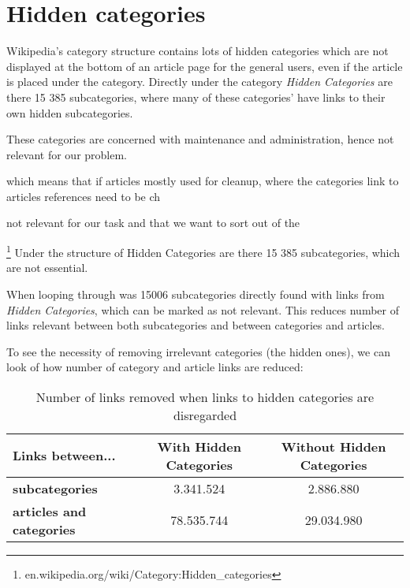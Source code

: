 \section{Hidden categories}
Wikipedia's category structure contains lots of hidden categories which are not displayed at the bottom of an article page for the general users, even if the article is placed under the category. Directly under the category \emph{Hidden Categories} are there 15 385 subcategories, where many of these categories' have links to their own hidden subcategories. 


These categories are concerned with maintenance and administration, hence not relevant for our problem. 

which means that if articles 
mostly used for cleanup, where the categories link to articles references need to be ch


not relevant for our task and that we want to sort out of the 

\footnote{en.wikipedia.org/wiki/Category:Hidden\_categories}
Under the structure of Hidden Categories are there 15 385 subcategories, which are not essential.

When looping through \enwikicatlink was 15006 subcategories directly found with links from \emph{Hidden Categories}, which can be marked as not relevant. This reduces number of links relevant between both subcategories and between categories and articles. 

To see the necessity of removing irrelevant categories (the hidden ones), we can look of how number of category and article links are reduced: 
\begin{table}[h]
\centering
\begin{tabular}{l|c|c}
 \textbf{Links between...} & \textbf{With Hidden Categories} & \textbf{Without Hidden Categories}  \\ \hline
 \textbf{subcategories} & 3.341.524 & 2.886.880 \\
 \textbf{articles and categories} & 78.535.744 & 29.034.980 
\end{tabular}
\caption{Number of links removed when links to hidden categories are disregarded}
\label{tab:with_and_without_hidden_cats}
\end{table}